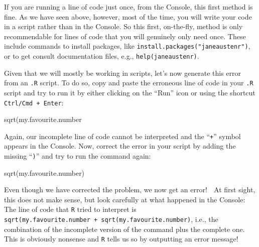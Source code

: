 \documentclass[
  letterpaper,
  DIV=11,
  numbers=noendperiod]{scrreprt}
\newenvironment{Shaded}{\begin{snugshade}}{\end{snugshade}}
\newcommand{\FunctionTok}[1]{\textcolor[rgb]{0.28,0.35,0.67}{#1}}
\newcommand{\NormalTok}[1]{\textcolor[rgb]{0.00,0.23,0.31}{#1}}
\begin{document}
If you are running a line of code just once, from the Console, this
first method is fine. As we have seen above, however, most of the time,
you will write your code in a script rather than in the Console. So this
first, on-the-fly, method is only recommendable for lines of code that
you will genuinely only need once. These include commands to install
packages, like \texttt{install.packages("janeaustenr")}, or to get
consult documentation files, e.g., \texttt{help(janeaustenr)}.

Given that we will mostly be working in scripts, let's now generate this
error from an \texttt{.R} script. To do so, copy and paste the erroneous
line of code in your \texttt{.R} script and try to run it by either
clicking on the ``Run'' icon or using the shortcut
\texttt{Ctrl/Cmd\ +\ Enter}:

\begin{Shaded}
\begin{Highlighting}[]
\FunctionTok{sqrt}\NormalTok{(my.favourite.number}
\end{Highlighting}
\end{Shaded}

Again, our incomplete line of code cannot be interpreted and the
``\texttt{+}'' symbol appears in the Console. Now, correct the error in
your script by adding the missing ``\texttt{)}'' and try to run the
command again:

\begin{Shaded}
\begin{Highlighting}[]
\FunctionTok{sqrt}\NormalTok{(my.favourite.number)}
\end{Highlighting}
\end{Shaded}

Even though we have corrected the problem, we now get an error! 🤯 At
first sight, this does not make sense, but look carefully at what
happened in the Console: The line of code that \texttt{R} tried to
interpret is
\texttt{sqrt(my.favourite.number\ +\ sqrt(my.favourite.number)}, i.e.,
the combination of the incomplete version of the command plus the
complete one. This is obviously nonsense and \texttt{R} tells us so by
outputting an error message!
\end{document}
